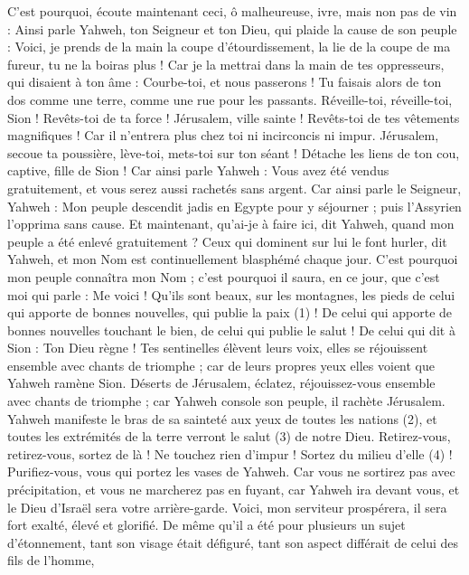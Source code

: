 \begin{multicols}{2}
C'est pourquoi, écoute maintenant ceci, ô malheureuse, ivre, mais non pas de vin :
Ainsi parle Yahweh, ton Seigneur et ton Dieu, qui plaide la cause de son peuple : Voici, je prends de la main la coupe d'étourdissement, la lie de la coupe de ma fureur, tu ne la boiras plus !
Car je la mettrai dans la main de tes oppresseurs, qui disaient à ton âme : Courbe-toi, et nous passerons ! Tu faisais alors de ton dos comme une terre, comme une rue pour les passants.
\VerseOne{}Réveille-toi, réveille-toi, Sion ! Revêts-toi de ta force ! Jérusalem, ville sainte ! Revêts-toi de tes vêtements magnifiques ! Car il n’entrera plus chez toi ni incirconcis ni impur.
Jérusalem, secoue ta poussière, lève-toi, mets-toi sur ton séant ! Détache les liens de ton cou, captive, fille de Sion !
Car ainsi parle Yahweh : Vous avez été vendus gratuitement, et vous serez aussi rachetés sans argent.
Car ainsi parle le Seigneur, Yahweh : Mon peuple descendit jadis en Egypte pour y séjourner ; puis l’Assyrien l’opprima sans cause.
Et maintenant, qu'ai-je à faire ici, dit Yahweh, quand mon peuple a été enlevé gratuitement ? Ceux qui dominent sur lui le font hurler, dit Yahweh, et mon Nom est continuellement blasphémé chaque jour.
C'est pourquoi mon peuple connaîtra mon Nom ; c'est pourquoi il saura, en ce jour, que c'est moi qui parle : Me voici !
Qu’ils sont beaux, sur les montagnes, les pieds de celui qui apporte de bonnes nouvelles, qui publie la paix (1) ! De celui qui apporte de bonnes nouvelles touchant le bien, de celui qui publie le salut ! De celui qui dit à Sion : Ton Dieu règne !
Tes sentinelles élèvent leurs voix, elles se réjouissent ensemble avec chants de triomphe ; car de leurs propres yeux elles voient que Yahweh ramène Sion.
Déserts de Jérusalem, éclatez, réjouissez-vous ensemble avec chants de triomphe ; car Yahweh console son peuple, il rachète Jérusalem.
Yahweh manifeste le bras de sa sainteté aux yeux de toutes les nations (2), et toutes les extrémités de la terre verront le salut (3) de notre Dieu.
Retirez-vous, retirez-vous, sortez de là ! Ne touchez rien d’impur ! Sortez du milieu d'elle (4) ! Purifiez-vous, vous qui portez les vases de Yahweh.
Car vous ne sortirez pas avec précipitation, et vous ne marcherez pas en fuyant, car Yahweh ira devant vous, et le Dieu d'Israël sera votre arrière-garde.
Voici, mon serviteur prospérera, il sera fort exalté, élevé et glorifié.
De même qu’il a été pour plusieurs un sujet d’étonnement, tant son visage était défiguré, tant son aspect différait de celui des fils de l’homme,

\end{multicols}

